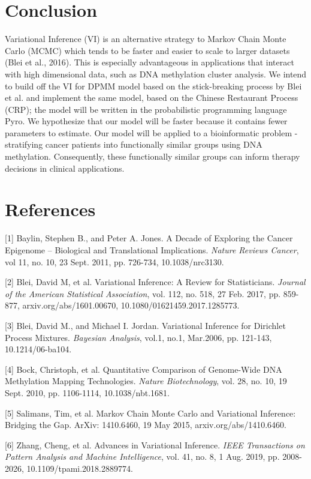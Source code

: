 \documentclass{article}
\begin{document}
\section{Conclusion}
Variational Inference (VI) is an alternative strategy to Markov Chain Monte Carlo (MCMC) which tends to be faster and easier to scale to larger datasets (Blei et al., 2016). This is especially advantageous in applications that interact with high dimensional data, such as DNA methylation cluster analysis. We intend to build off the VI for DPMM model based on the stick-breaking process by Blei et al. and implement the same model, based on the Chinese Restaurant Process (CRP); the model will be written in the probabilistic programming language Pyro. We hypothesize that our model will be faster because it contains fewer parameters to estimate. Our model will be applied to a bioinformatic problem - stratifying cancer patients into functionally similar groups using DNA methylation. Consequently, these functionally similar groups can inform therapy decisions in clinical applications. 

\section*{References}

\medskip
{
\small

[1] Baylin, Stephen B., and Peter A. Jones.  A Decade of Exploring the Cancer Epigenome -- Biological and Translational Implications.  {\it Nature Reviews Cancer}, vol 11, no. 10, 23 Sept. 2011, pp. 726-734, 10.1038/nrc3130.

[2] Blei, David M, et al. Variational Inference: A Review for Statisticians. {\it Journal of the American Statistical Association}, vol. 112, no. 518, 27 Feb. 2017, pp. 859-877, arxiv.org/abs/1601.00670, 10.1080/01621459.2017.1285773.

[3] Blei, David M., and Michael I. Jordan. Variational Inference for Dirichlet Process Mixtures. {\it Bayesian Analysis}, vol.1, no.1, Mar.2006, pp. 121-143, 10.1214/06-ba104.

[4] Bock, Christoph, et al. Quantitative Comparison of Genome-Wide DNA Methylation Mapping Technologies. {\it Nature Biotechnology}, vol. 28, no. 10, 19 Sept. 2010, pp. 1106-1114, 10.1038/nbt.1681.

[5] Salimans, Tim, et al.  Markov Chain Monte Carlo and Variational Inference: Bridging the Gap. ArXiv: 1410.6460, 19 May 2015, arxiv.org/abs/1410.6460.

[6] Zhang, Cheng, et al. Advances in Variational Inference. {\it IEEE Transactions on Pattern Analysis and Machine Intelligence}, vol. 41, no. 8, 1 Aug. 2019, pp. 2008-2026, 10.1109/tpami.2018.2889774.
}
\end{document}
